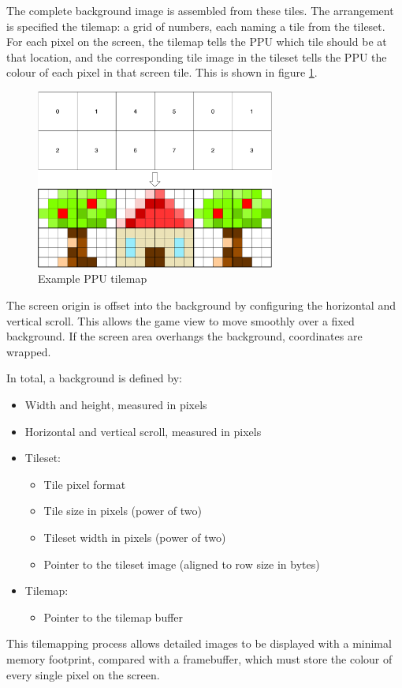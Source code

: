 The complete background image is assembled from these tiles. The arrangement is specified the tilemap: a grid of numbers, each naming a tile from the tileset. For each pixel on the screen, the tilemap tells the PPU which tile should be at that location, and the corresponding tile image in the tileset tells the PPU the colour of each pixel in that screen tile. This is shown in figure \ref{diagram:ppu_tilemap}.

\begin{figure}[H]
\centering
\caption{Example PPU tilemap}
\label{diagram:ppu_tilemap}
\includegraphics[width=0.7\textwidth]{diagrams/ppu_tilemap.pdf}
\end{figure}

The screen origin is offset into the background by configuring the horizontal and vertical scroll. This allows the game view to move smoothly over a fixed background. If the screen area overhangs the background, coordinates are wrapped.

In total, a background is defined by:

\begin{itemize}
	\item Width and height, measured in pixels
	\item Horizontal and vertical scroll, measured in pixels
	\item Tileset:
	\begin{itemize}
		\item Tile pixel format
		\item Tile size in pixels (power of two)
		\item Tileset width in pixels (power of two)
		\item Pointer to the tileset image (aligned to row size in bytes)
	\end{itemize}
	\item Tilemap:
	\begin{itemize}
		\item Pointer to the tilemap buffer
	\end{itemize}
\end{itemize}

This tilemapping process allows detailed images to be displayed with a minimal memory footprint, compared with a framebuffer, which must store the colour of every single pixel on the screen.
